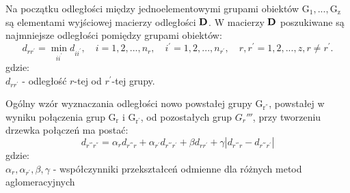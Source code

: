 \documentclass[12pt,a4paper]{report}
\begin{document}
Na początku odległości między jednoelementowymi grupami obiektów $\mathrm{G_{1}},...,\mathrm{G_{z}}$ są elementami wyjściowej macierzy odległości $\bold{D}$. W macierzy $\bold{D}$ poszukiwane są najmniejsze odległości pomiędzy grupami obiektów:
\begin{equation}
d_{rr^{'}}= \min\limits_{ii^{'}} {d_{ii^{'}}}, \quad i=1,2,...,n_{r}, \quad i^{'}=1,2,...,n_{r^{'}}, \quad r,r^{'}=1,2,...,z, r\neq r^{'}.
\end{equation}
gdzie:\\
$d_{rr^{'}}$ - odległość $r$-tej od $r^{'}$-tej grupy.

Ogólny wzór wyznaczania odległości nowo powstałej grupy $\mathrm{G_{r^{''}}}$, powstałej w wyniku połączenia grup $\mathrm{G_{r}}$ i $\mathrm{G_{r^{'}}}$, od pozostałych grup ${G_r{'''}}$, przy tworzeniu drzewka połączeń ma postać:
\begin{equation}
d_{r^{'''}r^{''}}=\alpha_{r}d_{r^{'''}r} + \alpha_{r^{'}}d_{r^{'''}r^{'}} + \beta d_{rr^{'}} + \gamma|d_{r^{'''}r} - d_{r^{'''}r^{'}}| 
\end{equation}
gdzie:\\
$\alpha_{r},\alpha_{r^{'}}, \beta, \gamma$ - współczynniki przekształceń odmienne dla różnych metod aglomeracyjnych
\end{document}
